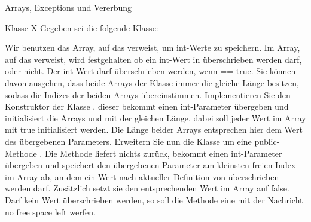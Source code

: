 \documentclass{../preamble}
\begin{document}
\begin{task}[credit = \stars{3}{3}]{Arrays, Exceptions und Vererbung}
    \begin{subtask*}{Klasse X}
        \label{task:12.1}
        Gegeben sei die folgende Klasse:
        
        Wir benutzen das Array, auf das  verweist, um \textcolor{keywordcolor}{int}-Werte zu speichern. Im Array, auf das  verweist, wird festgehalten ob ein \textcolor{keywordcolor}{int}-Wert in  überschrieben werden darf, oder nicht. Der \textcolor{keywordcolor}{int}-Wert  darf überschrieben werden, wenn  == \textcolor{keywordcolor}{true}. Sie können davon ausgehen, dass beide Arrays der Klasse  immer die gleiche Länge besitzen, sodass die Indizes der beiden Arrays übereinstimmen.
        \br
        Implementieren Sie den Konstruktor der Klasse , dieser bekommt einen \textcolor{keywordcolor}{int}-Parameter übergeben und initialisiert die Arrays  und  mit der gleichen Länge, dabei soll jeder Wert im Array  mit \textcolor{keywordcolor}{true} initialisiert werden. Die Länge beider Arrays entsprechen hier dem Wert des übergebenen Parameters. Erweitern Sie nun die Klasse um eine \textcolor{keywordcolor}{public}-Methode . Die Methode liefert nichts zurück, bekommt einen \textcolor{keywordcolor}{int}-Parameter übergeben und speichert den übergebenen Parameter am kleinsten freien Index im Array  ab, an dem ein Wert nach aktueller Definition von  überschrieben werden darf. Zusätzlich setzt sie den entsprechenden Wert im Array  auf \textcolor{keywordcolor}{false}. Darf kein Wert überschrieben werden, so soll die Methode eine  mit der Nachricht \textcolor{stringcolor}{\grqq no free space left\grqq} werfen.

        \clearpage

        \begin{solution}
            
        \end{solution}
    \end{subtask*}

    \clearpage

\end{task}
\end{document}
